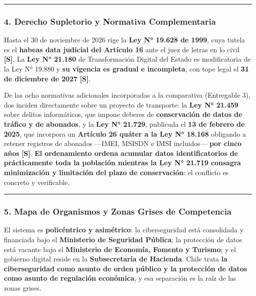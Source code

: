 \begin{center}\rule{0.5\linewidth}{0.5pt}\end{center}

\subsubsection{4. Derecho Supletorio y Normativa Complementaria}\label{derecho-supletorio-y-normativa-complementaria}

Hasta el 30 de noviembre de 2026 rige la \textbf{Ley N° 19.628 de 1999}, cuya tutela es el \textbf{habeas data judicial del Artículo 16} ante el juez de letras en lo civil \textbf{{[}S{]}}. La \textbf{Ley N° 21.180} de Transformación Digital del Estado es modificatoria de la Ley N° 19.880 y \textbf{su vigencia es gradual e incompleta}, con tope legal el \textbf{31 de diciembre de 2027} \textbf{{[}S{]}}.

De las ocho normativas adicionales incorporadas a la comparativa (Entregable 3), dos inciden directamente sobre un proyecto de transporte: la \textbf{Ley N° 21.459} sobre delitos informáticos, que impone deberes de \textbf{conservación de datos de tráfico y de abonados}, y la \textbf{Ley N° 21.729}, publicada el \textbf{13 de febrero de 2025}, que incorpora un \textbf{Artículo 26 quáter a la Ley N° 18.168} obligando a retener registros de abonados ---IMEI, MSISDN e IMSI incluidos--- \textbf{por cinco años} \textbf{{[}S{]}}. \textbf{El ordenamiento ordena acumular datos identificatorios de prácticamente toda la población mientras la Ley N° 21.719 consagra minimización y limitación del plazo de conservación}: el conflicto es concreto y verificable.

\begin{center}\rule{0.5\linewidth}{0.5pt}\end{center}

\subsubsection{5. Mapa de Organismos y Zonas Grises de Competencia}\label{mapa-de-organismos-y-zonas-grises-de-competencia}

El sistema es \textbf{policéntrico y asimétrico}: la ciberseguridad está consolidada y financiada bajo el \textbf{Ministerio de Seguridad Pública}; la protección de datos está vacante bajo el \textbf{Ministerio de Economía, Fomento y Turismo}; y el gobierno digital reside en la \textbf{Subsecretaría de Hacienda}. Chile trata \textbf{la ciberseguridad como asunto de orden público y la protección de datos como asunto de regulación económica}, y esa separación es la raíz de las zonas grises.

